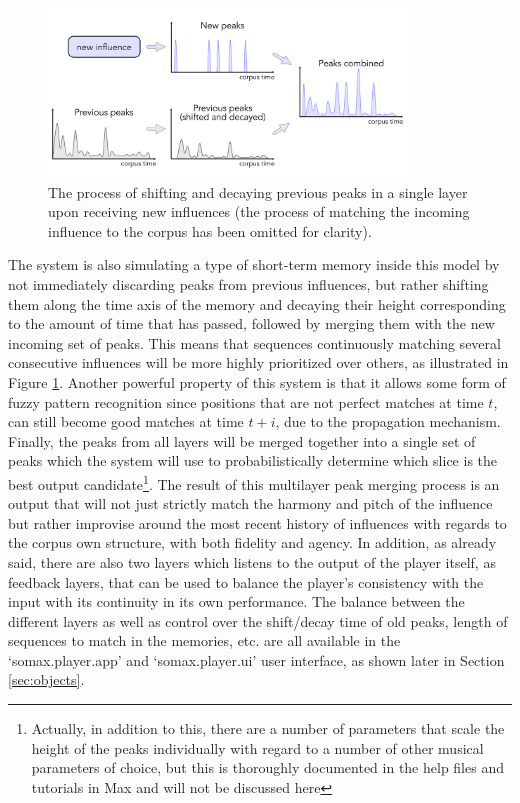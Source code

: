  \begin{figure}[h]
    \centering        
 	\includegraphics[width=0.85\textwidth]{img/peaks_decay.png}
    \caption{The process of shifting and decaying previous peaks in a single layer upon receiving new influences (the process of matching the incoming influence to the corpus has been omitted for clarity).}
    \label{fig:peakdecay}
\end{figure}

The system is also simulating a type of short-term memory inside this model by not immediately discarding peaks from previous influences, but rather shifting them along the time axis of the memory and decaying their height corresponding to the amount of time that has passed, followed by merging them with the new incoming set of peaks. This means that sequences continuously matching several consecutive influences will be more highly prioritized over others, as illustrated in Figure \ref{fig:peakdecay}. Another powerful property of this system is that it allows some form of fuzzy pattern recognition since positions that are not perfect matches at time $t$, can still become good matches at time $t + i$, due to the propagation mechanism. Finally, the peaks from all layers will be merged together into a single set of peaks which the system will use to probabilistically determine which slice is the best output candidate\footnote{Actually, in addition to this, there are a number of parameters that scale the height of the peaks individually with regard to a number of other musical parameters of choice, but this is thoroughly documented in the help files and tutorials in Max and will not be discussed here}. The result of this multilayer peak merging process is an output that will not just strictly match the harmony and pitch of the influence but rather improvise around the most recent history of influences with regards to the corpus own structure, with both fidelity and agency. In addition, as already said, there are also two layers which listens to the output of the player itself, as feedback layers, that can be used to balance the player's consistency with the input with its continuity in its own performance. The balance between the different layers as well as control over the shift/decay time of old peaks, length of sequences to match in the memories, etc. are all available in the `somax.player.app' and `somax.player.ui' user interface, as shown later in Section \ref{sec:objects}. 


